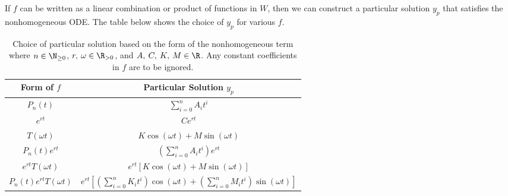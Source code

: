 \documentclass{article}
\begin{document}
If \(f\) can be written as a linear combination or product of functions in \(W\),
then we can construct a particular solution \(y_p\) that satisfies the nonhomogeneous ODE.
The table below shows the choice of \(y_p\) for various \(f\).
\begin{table}[H]
    \centering
    \begin{tabular}{c | c}
        \toprule
        \textbf{Form of \(f\)}                                   & \textbf{Particular Solution \(y_p\)}                                                                                                                                               \\
        \midrule
        \(P_n\left( t \right)\)                                  & \(\displaystyle \sum_{i = 0}^n A_i t^i\)                                                                                                                                           \\
        \(e^{r t}\)                                              & \(C e^{r t}\)                                                                                                                                                                      \\
        \(T\left( \omega t \right)\)                             & \(K \cos{\left( \omega t \right)} + M \sin{\left( \omega t \right)}\)                                                                                                              \\
        \midrule
        \(P_n\left( t \right) e^{r t}\)                          & \(\displaystyle \left( \sum_{i = 0}^n A_i t^i \right) e^{r t}\)                                                                                                                    \\
        \(e^{r t} T\left( \omega t \right)\)                     & \(\displaystyle e^{r t} \left[ K \cos{\left( \omega t \right)} + M \sin{\left( \omega t \right)} \right]\)                                                                         \\
        \(P_n\left( t \right) e^{r t} T\left( \omega t \right)\) & \(\displaystyle e^{r t} \left[ \left( \sum_{i = 0}^n K_i t^i \right) \cos{\left( \omega t \right)} + \left( \sum_{i = 0}^n M_i t^i \right) \sin{\left( \omega t \right)} \right]\) \\
        \bottomrule
    \end{tabular}
    \caption{Choice of particular solution based on the form of the nonhomogeneous term where
        \(n \in \N_{\geq 0}\), \(r,\: \omega \in \R_{>0}\), and \(A,\: C,\: K,\: M \in \R\).
        Any constant coefficients in \(f\) are to be ignored.} %
\end{table}
\end{document}
